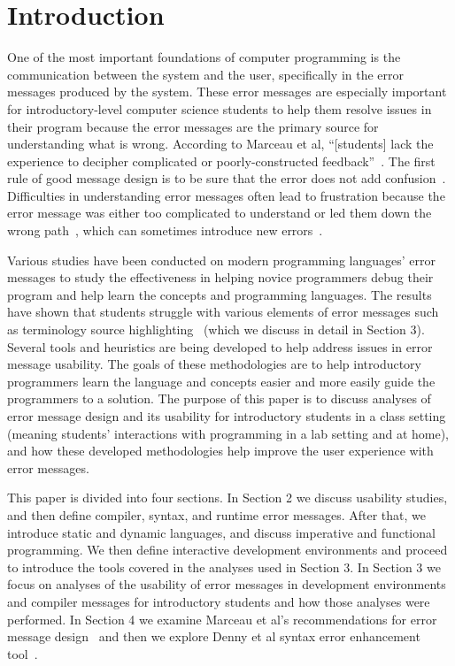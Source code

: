 \documentclass{sig-alternate}
\begin{document}


\section{Introduction}\label{sec:intro}
One of the most important foundations of computer programming is the communication between the system and the user, specifically in the error messages produced by the system.
These error messages are especially important for introductory-level computer science students to help them resolve issues in their program because the error messages are the primary source for understanding what is wrong.
According to Marceau et al, ``[students] lack the experience to decipher complicated or poorly-constructed feedback''~\cite{Marceau:2011:MEE:1953163.1953308}.
The first rule of good message design is to be sure that the error does not add confusion~\cite{Isa:1983:MOE:800045.801583}.
Difficulties in understanding error messages often lead to frustration because the error message was either too complicated to understand or led them down the wrong path~\cite{Marceau:2011:MYL:2048237.2048241}, which can sometimes introduce new errors~\cite{Denny:2014:ESE:2591708.2591748}.

Various studies have been conducted on modern programming languages' error messages to study the effectiveness in helping novice programmers debug their program and help learn the concepts and programming languages.
The results have shown that students struggle with various elements of error messages such as terminology source highlighting~\cite{Denny:2014:ESE:2591708.2591748,Traver:2010} (which we discuss in detail in Section 3).
Several tools and heuristics are being developed to help address issues in error message usability.
The goals of these methodologies are to help introductory programmers learn the language and concepts easier and more easily guide the programmers to a solution.
The purpose of this paper is to discuss analyses of error message design and its usability for introductory students in a class setting (meaning students' interactions with programming in a lab setting and at home), and how these developed methodologies help improve the user experience with error messages. 

This paper is divided into four sections.
In Section 2 we discuss usability studies, and then define compiler, syntax, and runtime error messages. After that, we introduce static and dynamic languages, and discuss imperative and functional programming. We then define interactive development environments and proceed to introduce the tools covered in the analyses used in Section 3.
In Section 3 we focus on analyses of the usability of error messages in development environments and compiler messages for introductory students and how those analyses were performed.
In Section 4 we examine Marceau et al's recommendations for error message design~\cite{Marceau:2011:MYL:2048237.2048241} and then we explore Denny et al syntax error enhancement tool~\cite{Denny:2014:ESE:2591708.2591748}.
\end{document}
